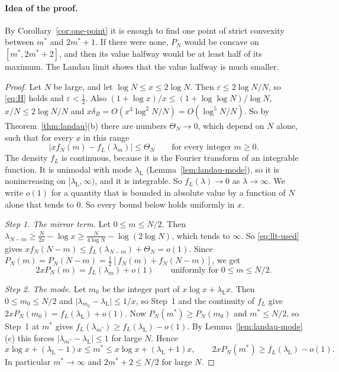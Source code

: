 \paragraph{Idea of the proof.}
By Corollary~\ref{cor:one-point} it is enough to find one point of strict
convexity between $m^*$ and $2m^*+1$. If there were none, $P_N$ would be
concave on $[m^*,2m^*+2]$, and then its value halfway would be at least half of
its maximum. The Landau limit shows that the value halfway is much smaller.

\begin{proof}
Let $N$ be large, and let $\log N\le x\le2\log N$. Then $\varepsilon\le2\log N/N$, so
\eqref{eq:H} holds and $\varepsilon<\frac12$. Also $(1+\log x)/x\le(1+\log\log N)/\log N$,
$x/N\le2\log N/N$ and $x\delta_B=O(x^3\log^2N/N)=O(\log^5N/N)$. So by
Theorem~\ref{thm:landau}(b) there are numbers $\Theta_N\to0$, which depend on $N$ alone, such
that for every $x$ in this range
\begin{equation}\label{eq:llt-used}
 \bigl\lvert xf_N(m)-f_L(\lambda_m)\bigr\rvert\le\Theta_N\qquad\text{for every integer }m\ge0 .
\end{equation}
The density $f_L$ is continuous, because it is the Fourier transform of an
integrable function. It is unimodal with mode $\lambda_{\mathrm L}$
(Lemma~\ref{lem:landau-mode}), so it is nonincreasing on
$[\lambda_{\mathrm L},\infty)$, and it is integrable. So
$f_L(\lambda)\to0$ as $\lambda\to\infty$. We write $o(1)$ for a quantity that
is bounded in absolute value by a function of $N$ alone that tends to $0$. So every bound
below holds uniformly in $x$.

\emph{Step 1. The mirror term.} Let $0\le m\le N/2$. Then
$\lambda_{N-m}\ge\frac N{2x}-\log x\ge\frac N{4\log N}-\log(2\log N)$, which tends to
$\infty$. So \eqref{eq:llt-used} gives
$xf_N(N-m)\le f_L(\lambda_{N-m})+\Theta_N=o(1)$. Since
$P_N(m)=P_N(N-m)=\frac12[f_N(m)+f_N(N-m)]$, we get
\[
 2xP_N(m)=f_L(\lambda_m)+o(1)\qquad\text{uniformly for }0\le m\le N/2 .
\]

\emph{Step 2. The mode.} Let $m_0$ be the integer part of
$x\log x+\lambda_{\mathrm L}x$. Then $0\le m_0\le N/2$ and
$\lvert\lambda_{m_0}-\lambda_{\mathrm L}\rvert\le1/x$, so Step~1 and the continuity of
$f_L$ give $2xP_N(m_0)=f_L(\lambda_{\mathrm L})+o(1)$. Now $P_N(m^*)\ge P_N(m_0)$ and
$m^*\le N/2$, so Step~1 at $m^*$ gives
$f_L(\lambda_{m^*})\ge f_L(\lambda_{\mathrm L})-o(1)$. By
Lemma~\ref{lem:landau-mode}(c) this forces
$\lvert\lambda_{m^*}-\lambda_{\mathrm L}\rvert\le1$ for large $N$. Hence
\[
 x\log x+(\lambda_{\mathrm L}-1)x\le m^*\le x\log x+(\lambda_{\mathrm L}+1)x,\qquad
 2xP_N(m^*)\ge f_L(\lambda_{\mathrm L})-o(1).
\]
In particular $m^*\to\infty$ and $2m^*+2\le N/2$ for large $N$.


\end{proof}
